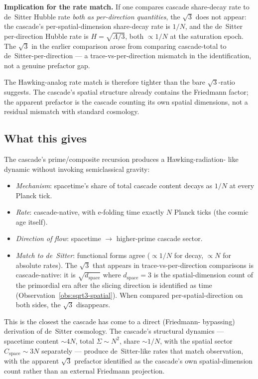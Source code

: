 \documentclass[11pt,a4paper]{article}
\begin{document}
\textbf{Implication for the rate match.} If one compares cascade
share-decay rate to de~Sitter Hubble rate \emph{both as per-direction
quantities}, the $\sqrt{3}$ does not appear: the cascade's
per-spatial-dimension share-decay rate is $1/N$, and the de~Sitter
per-direction Hubble rate is $H = \sqrt{\Lambda/3}$, both
$\propto 1/N$ at the saturation epoch. The $\sqrt{3}$ in the earlier
comparison arose from comparing cascade-total to de~Sitter-per-direction
--- a trace-vs-per-direction mismatch in the identification, not
a genuine prefactor gap.

The Hawking-analog rate match is therefore tighter than the bare
$\sqrt{3}$-ratio suggests. The cascade's spatial structure already
contains the Friedmann factor; the apparent prefactor is the cascade
counting its own spatial dimensions, not a residual mismatch with
standard cosmology.

\subsection*{What this gives}

The cascade's prime/composite recursion produces a Hawking-radiation-
like dynamic without invoking semiclassical gravity:

\begin{itemize}
\item \emph{Mechanism}: spacetime's share of total cascade content
decays as $1/N$ at every Planck tick.
\item \emph{Rate}: cascade-native, with e-folding time exactly $N$
Planck ticks (the cosmic age itself).
\item \emph{Direction of flow}: spacetime $\to$ higher-prime cascade
sector.
\item \emph{Match to de~Sitter}: functional forms agree
($\propto 1/N$ for decay, $\propto N$ for absolute rates). The
$\sqrt{3}$ that appears in trace-vs-per-direction comparisons is
cascade-native: it is $\sqrt{d_{\mathrm{space}}}$ where
$d_{\mathrm{space}} = 3$ is the spatial-dimension count of the
primordial era after the slicing direction is identified as time
(Observation~\ref{obs:sqrt3-spatial}). When compared
per-spatial-direction on both sides, the $\sqrt{3}$ disappears.
\end{itemize}

This is the closest the cascade has come to a direct (Friedmann-
bypassing) derivation of de~Sitter cosmology. The cascade's
structural dynamics --- spacetime content $\sim 4N$, total $\Sigma
\sim N^2$, share $\sim 1/N$, with the spatial sector $C_{\mathrm{space}}
\sim 3N$ separately --- produce de~Sitter-like rates that match
observation, with the apparent $\sqrt{3}$ prefactor identified as
the cascade's own spatial-dimension count rather than an external
Friedmann projection.
\end{document}
